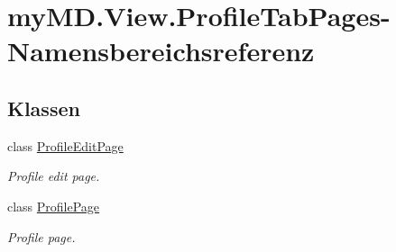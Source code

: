 \hypertarget{namespacemy_m_d_1_1_view_1_1_profile_tab_pages}{}\section{my\+M\+D.\+View.\+Profile\+Tab\+Pages-\/\+Namensbereichsreferenz}
\label{namespacemy_m_d_1_1_view_1_1_profile_tab_pages}
\subsection*{Klassen}
\begin{DoxyCompactItemize}
\item 
class \mbox{\hyperlink{classmy_m_d_1_1_view_1_1_profile_tab_pages_1_1_profile_edit_page}{Profile\+Edit\+Page}}
\begin{DoxyCompactList}\small\item\em Profile edit page. \end{DoxyCompactList}\item 
class \mbox{\hyperlink{classmy_m_d_1_1_view_1_1_profile_tab_pages_1_1_profile_page}{Profile\+Page}}
\begin{DoxyCompactList}\small\item\em Profile page. \end{DoxyCompactList}\end{DoxyCompactItemize}
